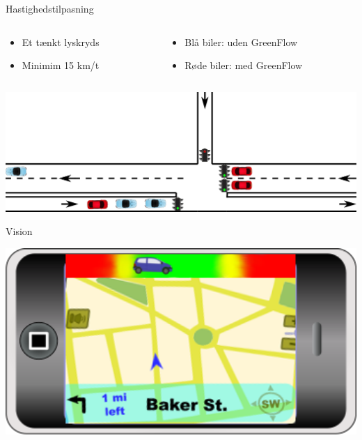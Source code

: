 \begin{frame}{Hastighedstilpasning}
\begin{columns}
\begin{column}{0.4\textwidth}
\begin{itemize}
\item Et tænkt lyskryds
\item Minimim 15 km/t
\end{itemize}
\end{column}
\begin{column}{0.6\textwidth}
\begin{itemize}
\item Blå biler: uden GreenFlow
\item Røde biler: med GreenFlow
\end{itemize}
\end{column}
\end{columns}
\vspace{3mm}
\includegraphics[width=1\textwidth]{../images/introNetworkSimple2.png}
\end{frame}

\begin{frame}{Vision}
\begin{center}
\includegraphics[width=1\textwidth]{../images/product.png}
\end{center}
\end{frame}

